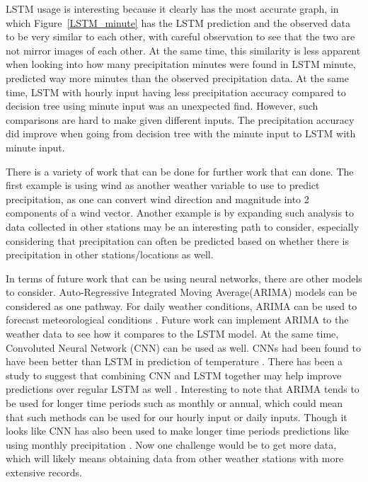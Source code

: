 \documentclass[11pt]{report}
\begin{document}
LSTM usage is interesting because it clearly has the most accurate graph, in which Figure~\ref{LSTM_minute} has the LSTM prediction and the observed data to be very similar to each other, with careful observation to see that the two are not mirror images of each other. At the same time, this similarity is less apparent when looking into how many precipitation minutes were found in LSTM minute, predicted way more minutes than the observed precipitation data. At the same time, LSTM with hourly input having less precipitation accuracy compared to decision tree using minute input was an unexpected find. However, such comparisons are hard to make given different inputs. The precipitation accuracy did improve when going from decision tree with the minute input to LSTM with minute input. 


There is a variety of work that can be done for further work that can done. The first example is using wind as another weather
variable to use to predict precipitation, as one can convert wind
direction and magnitude into 2 components of a wind vector. Another example is
by expanding such analysis to data collected in other stations may be an
interesting path to consider, especially considering that precipitation
can often be predicted based on whether there is precipitation in other
stations/locations as well. 

In terms of future work that can be using neural networks, there are other models to consider. Auto-Regressive Integrated Moving Average(ARIMA) models can be considered as one pathway. For daily weather conditions, ARIMA can be used to forecast meteorological conditions \cite[]{ARIMA}. Future work can implement ARIMA to the weather data to see how it compares to the LSTM model. At the same time, Convoluted Neural Network (CNN) can be used as well. CNNs had been found to have been better than LSTM in prediction of temperature \cite[]{CNN}. There has been a study to suggest that combining CNN and LSTM together may help improve predictions over regular LSTM as well \cite[]{shi2015convolutional}. Interesting to note that ARIMA tends to be used for longer time periods such as monthly or annual, which could mean that such methods can be used for our hourly input or daily inputs. Though it looks like CNN has also been used to make longer time periods predictions like using monthly precipitation \cite[]{Month_CNN}. Now one challenge would be to get more data, which will likely means obtaining data from other weather stations with more extensive records. 
\end{document}

